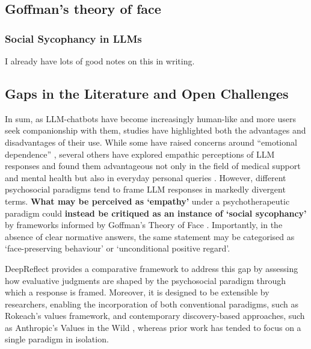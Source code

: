 
\subsection{Goffman's theory of face}
\textcolor{black!30}{\lipsum[9-10]}
\subsubsection{Social Sycophancy in LLMs}
\textcolor{black!30}{I already have lots of good notes on this in writing.}
\textcolor{black!30}{\lipsum[12-14]}

\subsection{Gaps in the Literature and Open Challenges}
In sum, as LLM-chatbots have become increasingly human-like and more users seek companionship with them, studies have highlighted both the advantages and disadvantages of their use. While some have raised concerns around “emotional dependence” \cite{fang-etal-psychoeffects}, several others have explored empathic perceptions of LLM responses and found them advantageous not only in the field of medical support and mental health but also in everyday personal queries \cite{Lee-etal-Empathic, sorin-etal-empathy}.
However, different psychosocial paradigms tend to frame LLM responses in markedly divergent terms. \textbf{What may be perceived as ‘empathy’} under a psychotherapeutic paradigm could \textbf{instead be critiqued as an instance of ‘social sycophancy’} by frameworks informed by Goffman's Theory of Face \cite{cheng-etal-sycophancy}.
Importantly, in the absence of clear normative answers, the same statement may be categorised as ‘face-preserving behaviour’ or ‘unconditional positive regard’. 


DeepReflect provides a comparative framework to address this gap by assessing how evaluative judgments are shaped by the psychosocial paradigm through which a response is framed. 
Moreover, it is designed to be extensible by researchers, enabling the incorporation of both conventional paradigms, such as Rokeach’s values framework, and contemporary discovery-based approaches, such as Anthropic’s Values in the Wild \cite{values-in-wild}, whereas prior work has tended to focus on a single paradigm in isolation.

